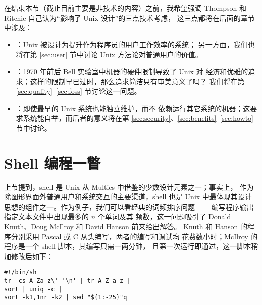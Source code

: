 在结束本节（截止目前主要是非技术的内容）之前，我希望强调 Thompson 和
Ritchie 自己认为“影响了 Unix 设计”的三点技术考虑，
这三点都将在后面的章节中涉及：
\begin{itemize}
\item {}：Unix 被设计为提升作为程序员的用户工作效率的系统；
	另一方面，我们也将在第 \ref{sec:user} 节中讨论 Unix 方法论对普通用户的价值。
\item {}：1970 年前后 Bell 实验室中机器的硬件限制导致了 Unix 对
	经济和优雅的追求；这样的限制早已过时，那么追求简洁只有审美意义了吗？
	我们将在第 \ref{sec:quality}--\ref{sec:foss} 节讨论这一问题。
\item {}：即使最早的 Unix 系统也能独立维护，而不
	依赖运行其它系统的机器；这要求系统能自举，而后者的意义将在第
	\ref{sec:security}、\ref{sec:benefits}--\ref{sec:howto} 节中讨论。
\end{itemize}

\section{Shell 编程一瞥}\label{sec:shell}

上节提到，shell 是 Unix 从 Multics 中借鉴的少数设计元素之一；事实上，
作为除图形界面外普通用户和系统交互的主要渠道，shell
也是 Unix 中最体现其设计思想的组件之一。作为例子，我们可以看经典的词频排序问题%
——编写程序输出指定文本文件中出现最多的 $n$ 个单词及其
频数，这一问题吸引了 Donald Knuth、Doug McIlroy 和 David Hanson 前来给出解答。
Knuth 和 Hanson 的程序分别采用 Pascal 或 C 从头编写，两者的编写和调试均
花费数小时；McIlroy 的程序是一个 shell 脚本，其编写只需一两分钟，
且第一次运行即通过，这一脚本稍加修改后如下：
\begin{wquoting}
\begin{Verbatim}
#!/bin/sh
tr -cs A-Za-z\' '\n' | tr A-Z a-z |
sort | uniq -c |
sort -k1,1nr -k2 | sed "${1:-25}"q
\end{Verbatim}
\end{wquoting}

